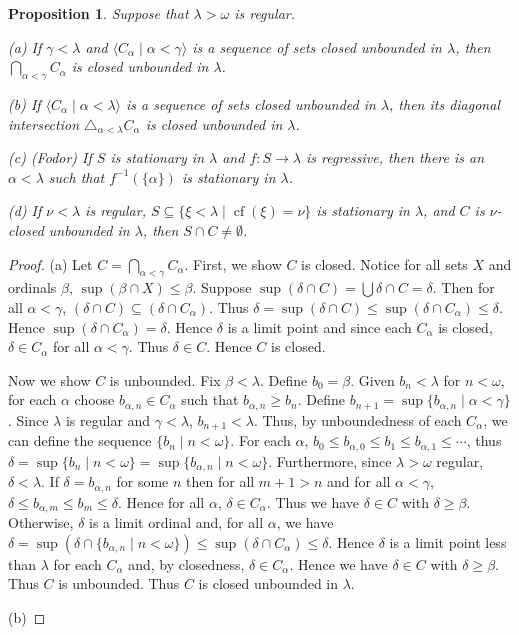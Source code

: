 \documentclass{article}
\newtheorem{proposition}[theorem]{Proposition}
\theoremstyle{definition}
\theoremstyle{remark}
\begin{document}
\begin{proposition}
	Suppose that $\lambda > \omega$ is regular. \par
	(a) If $\gamma <\lambda$ and $\langle C_\alpha \mid \alpha <\gamma \rangle$ is a sequence of sets closed unbounded in $\lambda$, then $\bigcap_{\alpha <\gamma} C_\alpha$ is closed unbounded in $\lambda$. \par
	(b) If  $\langle C_\alpha \mid \alpha <\lambda \rangle$ is a sequence of sets closed unbounded in $\lambda$, then its diagonal intersection $\triangle_{\alpha < \lambda}C_\alpha$ is closed unbounded in $\lambda$. \par
	(c) \emph{(Fodor)} If $S$ is stationary in $\lambda$ and $f:S\to\lambda$ is regressive, then there is an $\alpha<\lambda$ such that $f^{-1}(\{\alpha\})$ is stationary in $\lambda$. \par
	(d) If $\nu<\lambda$ is regular, $S\subseteq\{\xi<\lambda\mid\operatorname{cf}(\xi)=\nu\}$ is stationary in $\lambda$, and $C$ is $\nu$-closed unbounded in $\lambda$, then $S\cap C \neq\emptyset$.
\end{proposition}

\begin{proof}
(a) Let $C=\bigcap_{\alpha <\gamma} C_\alpha$. First, we show $C$ is closed. Notice for all sets $X$ and ordinals $\beta$, $\sup(\beta\cap X)\leq \beta$. Suppose $\sup(\delta\cap C)=\bigcup\delta\cap C=\delta$. Then for all $\alpha<\gamma$, $(\delta\cap C)\subseteq (\delta\cap C_\alpha)$. Thus $\delta=\sup(\delta\cap C)\leq\sup(\delta\cap C_\alpha)\leq \delta$. Hence $\sup(\delta\cap C_\alpha)=\delta$. Hence $\delta$ is a limit point and since each $C_\alpha$ is closed, $\delta \in C_\alpha$ for all $\alpha<\gamma$. Thus $\delta \in C$. Hence $C$ is closed. \par
Now we show $C$ is unbounded. Fix $\beta<\lambda$. Define $b_0=\beta$. Given $b_n<\lambda$ for $n<\omega$, for each $\alpha$ choose $b_{\alpha,n}\in C_\alpha$ such that $b_{\alpha,n} \geq b_n$. Define $b_{n+1}=\sup\{b_{\alpha,n} \mid \alpha<\gamma\}$. Since $\lambda$ is regular and $\gamma<\lambda$, $b_{n+1}<\lambda$. Thus, by unboundedness of each $C_\alpha$, we can define the sequence $\{b_n \mid n<\omega\}$. For each $\alpha$, $b_0\leq b_{\alpha,0}\leq b_1 \leq b_{\alpha,1} \leq \cdots$, thus $\delta=\sup\{b_n \mid n<\omega\}=\sup\{b_{\alpha,n} \mid n<\omega\}$. Furthermore, since $\lambda > \omega$ regular, $\delta < \lambda$. If $\delta = b_{\alpha,n}$ for some $n$ then for all $m+1>n$ and for all $\alpha < \gamma$, $\delta \leq b_{\alpha,m}\leq b_m \leq \delta$. Hence for all $\alpha$, $\delta \in C_\alpha$. Thus we have $\delta \in C$ with $\delta\geq\beta$. Otherwise, $\delta$ is a limit ordinal and, for all $\alpha$, we have $\delta=\sup(\delta\cap \{b_{\alpha,n}\mid n<\omega\})\leq\sup(\delta\cap C_\alpha)\leq\delta$. Hence $\delta$ is a limit point less than $\lambda$ for each $C_\alpha$ and, by closedness, $\delta \in C_\alpha$. Hence we have $\delta \in C$ with $\delta \geq \beta$. Thus $C$ is unbounded. Thus $C$ is closed unbounded in $\lambda$.  \par 
(b) 
\end{proof}
\end{document}

